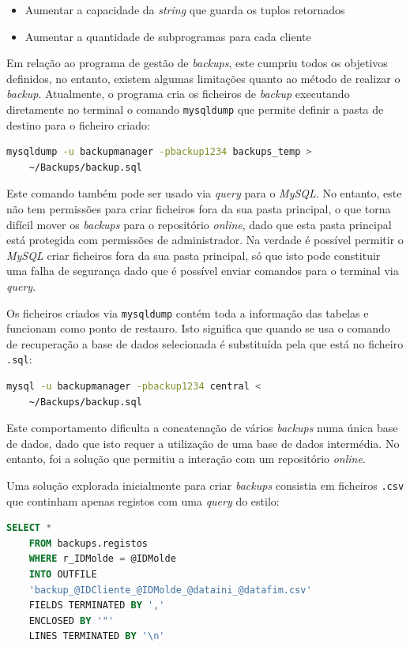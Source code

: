 \documentclass[11pt,twoside,a4paper]{report}
\begin{document}
\begin{itemize}
	\item Aumentar a capacidade da \textit{string} que guarda os tuplos retornados
	\item Aumentar a quantidade de subprogramas para cada cliente
\end{itemize}
Em relação ao programa de gestão de \textit{backups}, este cumpriu todos os objetivos definidos, no entanto, existem algumas limitações quanto ao método de realizar o \textit{backup}. Atualmente, o programa cria os ficheiros de \textit{backup} executando diretamente no terminal o comando \texttt{mysqldump} que permite definir a pasta de destino para o ficheiro criado:
\begin{lstlisting}[language = bash]
	mysqldump -u backupmanager -pbackup1234 backups_temp >
	~/Backups/backup.sql
\end{lstlisting}
Este comando também pode ser usado via \textit{query} para o \textit{MySQL}. No entanto, este não tem permissões para criar ficheiros fora da sua pasta principal, o que torna difícil mover os \textit{backups} para o repositório \textit{online}, dado que esta pasta principal está protegida com permissões de administrador. Na verdade é possível permitir o \textit{MySQL} criar ficheiros fora da sua pasta principal, só que isto pode constituir uma falha de segurança dado que é possível enviar comandos para o terminal via \textit{query}.\par 
Os ficheiros criados via \texttt{mysqldump} contém toda a informação das tabelas e funcionam como ponto de restauro. Isto significa que quando se usa o comando de recuperação a base de dados selecionada é substituída pela que está no ficheiro \texttt{.sql}:
\begin{lstlisting}[language = bash]
	mysql -u backupmanager -pbackup1234 central <
	~/Backups/backup.sql
\end{lstlisting}
Este comportamento dificulta a concatenação de vários \textit{backups} numa única base de dados, dado que isto requer a utilização de uma base de dados intermédia. No entanto, foi a solução que permitiu a interação com um repositório \textit{online}.\par 
Uma solução explorada inicialmente para criar \textit{backups} consistia em ficheiros \texttt{.csv} que continham apenas registos com uma \textit{query} do estilo:
\begin{lstlisting}[language = SQL]
	SELECT *
	FROM backups.registos
	WHERE r_IDMolde = @IDMolde
	INTO OUTFILE
	'backup_@IDCliente_@IDMolde_@dataini_@datafim.csv'
	FIELDS TERMINATED BY ','
	ENCLOSED BY '"'
	LINES TERMINATED BY '\n'
\end{lstlisting}
\end{document}
